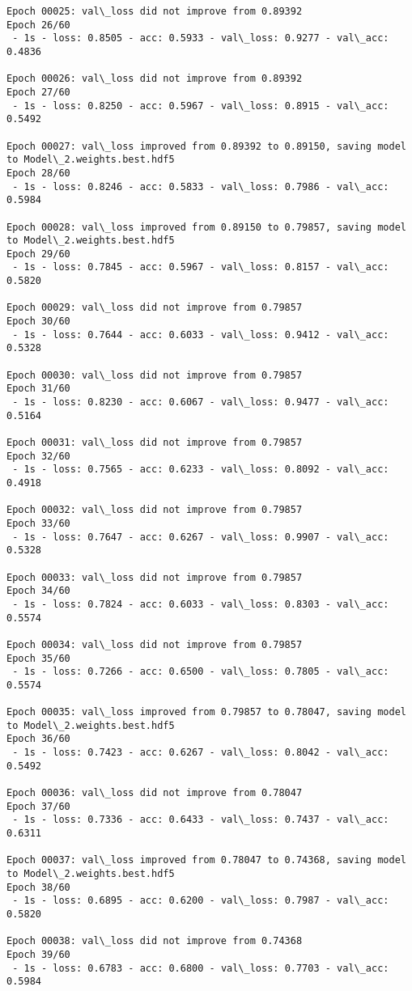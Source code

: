 \documentclass[11pt]{article}
\begin{document}
\begin{Verbatim}[commandchars=\\\{\}]
Epoch 00025: val\_loss did not improve from 0.89392
Epoch 26/60
 - 1s - loss: 0.8505 - acc: 0.5933 - val\_loss: 0.9277 - val\_acc: 0.4836

Epoch 00026: val\_loss did not improve from 0.89392
Epoch 27/60
 - 1s - loss: 0.8250 - acc: 0.5967 - val\_loss: 0.8915 - val\_acc: 0.5492

Epoch 00027: val\_loss improved from 0.89392 to 0.89150, saving model to Model\_2.weights.best.hdf5
Epoch 28/60
 - 1s - loss: 0.8246 - acc: 0.5833 - val\_loss: 0.7986 - val\_acc: 0.5984

Epoch 00028: val\_loss improved from 0.89150 to 0.79857, saving model to Model\_2.weights.best.hdf5
Epoch 29/60
 - 1s - loss: 0.7845 - acc: 0.5967 - val\_loss: 0.8157 - val\_acc: 0.5820

Epoch 00029: val\_loss did not improve from 0.79857
Epoch 30/60
 - 1s - loss: 0.7644 - acc: 0.6033 - val\_loss: 0.9412 - val\_acc: 0.5328

Epoch 00030: val\_loss did not improve from 0.79857
Epoch 31/60
 - 1s - loss: 0.8230 - acc: 0.6067 - val\_loss: 0.9477 - val\_acc: 0.5164

Epoch 00031: val\_loss did not improve from 0.79857
Epoch 32/60
 - 1s - loss: 0.7565 - acc: 0.6233 - val\_loss: 0.8092 - val\_acc: 0.4918

Epoch 00032: val\_loss did not improve from 0.79857
Epoch 33/60
 - 1s - loss: 0.7647 - acc: 0.6267 - val\_loss: 0.9907 - val\_acc: 0.5328

Epoch 00033: val\_loss did not improve from 0.79857
Epoch 34/60
 - 1s - loss: 0.7824 - acc: 0.6033 - val\_loss: 0.8303 - val\_acc: 0.5574

Epoch 00034: val\_loss did not improve from 0.79857
Epoch 35/60
 - 1s - loss: 0.7266 - acc: 0.6500 - val\_loss: 0.7805 - val\_acc: 0.5574

Epoch 00035: val\_loss improved from 0.79857 to 0.78047, saving model to Model\_2.weights.best.hdf5
Epoch 36/60
 - 1s - loss: 0.7423 - acc: 0.6267 - val\_loss: 0.8042 - val\_acc: 0.5492

Epoch 00036: val\_loss did not improve from 0.78047
Epoch 37/60
 - 1s - loss: 0.7336 - acc: 0.6433 - val\_loss: 0.7437 - val\_acc: 0.6311

Epoch 00037: val\_loss improved from 0.78047 to 0.74368, saving model to Model\_2.weights.best.hdf5
Epoch 38/60
 - 1s - loss: 0.6895 - acc: 0.6200 - val\_loss: 0.7987 - val\_acc: 0.5820

Epoch 00038: val\_loss did not improve from 0.74368
Epoch 39/60
 - 1s - loss: 0.6783 - acc: 0.6800 - val\_loss: 0.7703 - val\_acc: 0.5984


\end{Verbatim}
\end{document}
